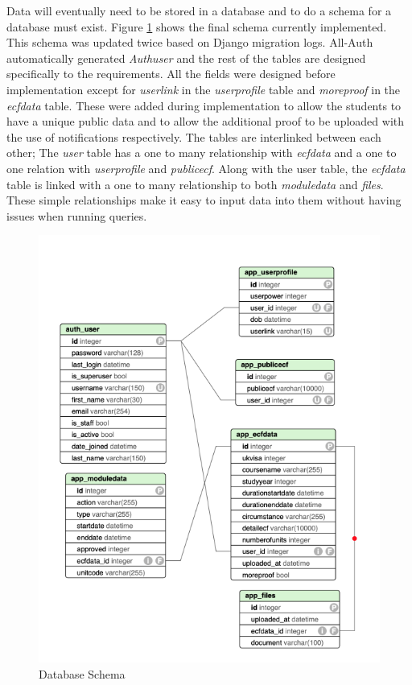\documentclass[../main.tex]{subfiles}
\begin{document}
\raggedright
Data will eventually need to be stored in a database and to do a schema for a database must exist. Figure \ref{fig:dbschema} shows the final schema currently implemented. This schema was updated twice based on Django migration logs. All-Auth\cite{allauth} automatically generated \textit{Authuser} and the rest of the tables are designed specifically to the requirements. All the fields were designed before implementation except for \textit{userlink} in the \textit{userprofile} table and \textit{moreproof} in the \textit{ecfdata} table. These were added during implementation to allow the students to have a unique public data and to allow the additional proof to be uploaded with the use of notifications respectively. The tables are interlinked between each other; The \textit{user} table has a one to many relationship with \textit{ecfdata} and a one to one relation with \textit{userprofile} and \textit{publicecf}. Along with the user table, the \textit{ecfdata} table is linked with a one to many relationship to both \textit{moduledata} and \textit{files}. These simple relationships make it easy to input data into them without having issues when running queries. 

\begin{figure}[H]
        \begin{center}
        \includegraphics[scale=1.2]
        {images/db.png}
        \caption{\label{fig:dbschema} Database Schema}
        \end{center}
      \end{figure}
  
  
\end{document}
